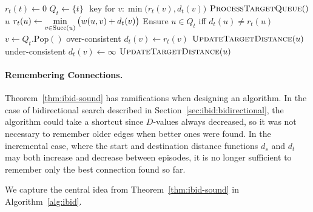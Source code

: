 {\begin{algorithm}[t]
\begin{minipage}[t]{8.2cm}
\begin{algorithmic}[1]
            \EndFor
            \State $r_t(t) \gets 0$
            \State $Q_t \gets \{ t \}$
               \Comment $\mbox{ key for } v: \min\big(r_t(v),d_t(v)\big)$
            \State $\mbox{\sc ProcessTargetQueue}()$
         \EndProcedure
          {$u$}
               \State $r_t(u) \gets \displaystyle\min_{v \in \mbox{\scriptsize Succ}(u)}
                  \big( w(u,v) + d_t(v) \big)$
            \EndIf
            \State Ensure $u \in Q_t$ iff $d_t(u) \neq r_t(u)$
         \EndProcedure
          {\,\!}
            \State $v \gets Q_t.\mbox{Pop}()$
                  \Comment over-consistent
               \State $d_t(v) \gets r_t(v)$
                  \State $\mbox{\sc UpdateTargetDistance}(u)$
               \EndFor
            \Else
                  \Comment under-consistent
               \State $d_t(v) \gets \infty$
                  \State $\mbox{\sc UpdateTargetDistance}(u)$
               \EndFor
            \EndIf
         \EndProcedure
      \end{algorithmic}
   \end{minipage}
\end{algorithm}
} %

\paragraph{Remembering Connections.}
Theorem~\ref{thm:ibid-sound} has ramifications when designing
an algorithm.
In the case of bidirectional search
described in Section~\ref{sec:ibid:bidirectional},
the algorithm could take a shortcut since $D$-values always decreased,
so it was not necessary to remember older edges when better
ones were found.
In the incremental case,
where the start and destination distance functions $d_s$ and $d_t$
may both increase and decrease between episodes,
it is no longer sufficient to remember only the best connection
found so far.

We capture the central idea from Theorem~\ref{thm:ibid-sound}
in Algorithm~\ref{alg:ibid}.

